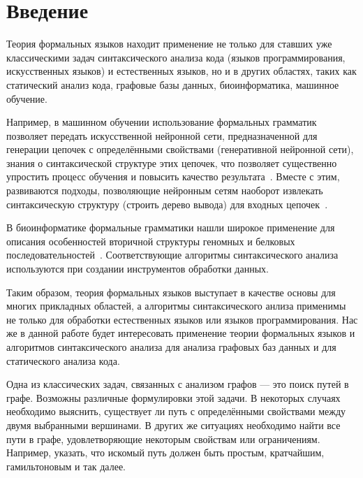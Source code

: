 \chapter*{Введение}

Теория формальных языков находит применение не только для ставших уже классическими задач синтаксического анализа кода (языков программирования, искусственных языков) и естественных языков, но и в других областях, таких как статический анализ кода, графовые базы данных, биоинформатика, машинное обучение.

Например, в машинном обучении использование формальных грамматик позволяет передать искусственной нейронной сети, предназначенной для генерации цепочек с определёнными свойствами (генеративной нейронной сети), знания о синтаксической структуре этих цепочек, что позволяет существенно упростить процесс обучения и повысить качество результата~\cite{10.5555/3305381.3305582}.
Вместе с этим, развиваются подходы, позволяющие нейронным сетям наоборот извлекать синтаксическую структуру (строить дерево вывода) для входных цепочек~\cite{kasai-etal-2017-tag,kasai-etal-2018-end}.

В биоинформатике формальные грамматики нашли широкое применение для описания особенностей вторичной структуры геномных и белковых последовательностей~\cite{Dyrka2019,WJAnderson2012,zier2013rna}.
Соответствующие алгоритмы синтаксического анализа используются при создании инструментов обработки данных.

Таким образом, теория формальных языков выступает в качестве основы для многих прикладных областей, а алгоритмы синтаксического анлиза применимы не только для обработки естественных языков или языков программирования.
Нас же в данной работе будет интересовать применение теории формальных языков и алгоритмов синтаксического анализа для анализа графовых баз данных и для статического анализа кода.

Одна из классических задач, связанных с анализом графов --- это поиск путей в графе.
Возможны различные формулировки этой задачи.
В некоторых случаях необходимо выяснить, существует ли путь с определёнными свойствами между двумя выбранными вершинами.
В других же ситуациях необходимо найти все пути в графе, удовлетворяющие некоторым свойствам или ограничениям. 
Например, указать, что искомый путь должен быть простым, кратчайшим, гамильтоновым и так далее.

